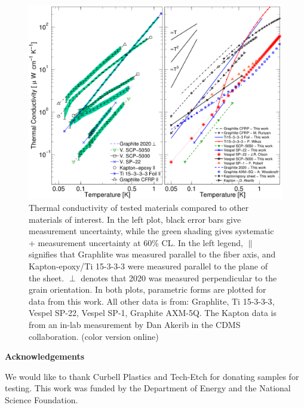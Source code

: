 \documentclass[final]{svjour2}
\begin{document}
\begin{figure}[h]
\includegraphics[width = \textwidth,trim = 0 0 0 0]{LTD15_double_k_plot_v4.png}
\caption{{\small Thermal conductivity of tested materials compared to other materials of interest. In the left plot, black error bars give measurement uncertainty, while the green shading gives systematic + measurement uncertainty at 60\% CL. In the left legend, $\parallel$ signifies that Graphlite was measured parallel to the fiber axis, and Kapton-epoxy/Ti 15-3-3-3 were measured parallel to the plane of the sheet. $\perp$ denotes that 2020 was measured perpendicular to the grain orientation. In both plots, parametric forms are plotted for data from this work. All other data is from: Graphlite\cite{Runyan2008}, Ti 15-3-3-3\cite{Wikus2010}, Vespel SP-22\cite{Olson1993}, Vespel SP-1\cite{Pobell1992}, Graphite AXM-5Q\cite{Woodcraft2009}. The Kapton data is from an in-lab measurement by Dan Akerib in the CDMS collaboration. (color version online)}}
\label{plots}
\end{figure}

\noindent \textbf{Acknowledgements}

\noindent We would like to thank Curbell Plastics and Tech-Etch for donating samples for testing. This work was funded by the Department of Energy and the National Science Foundation.


\vspace{-0.38cm}
\end{document}
